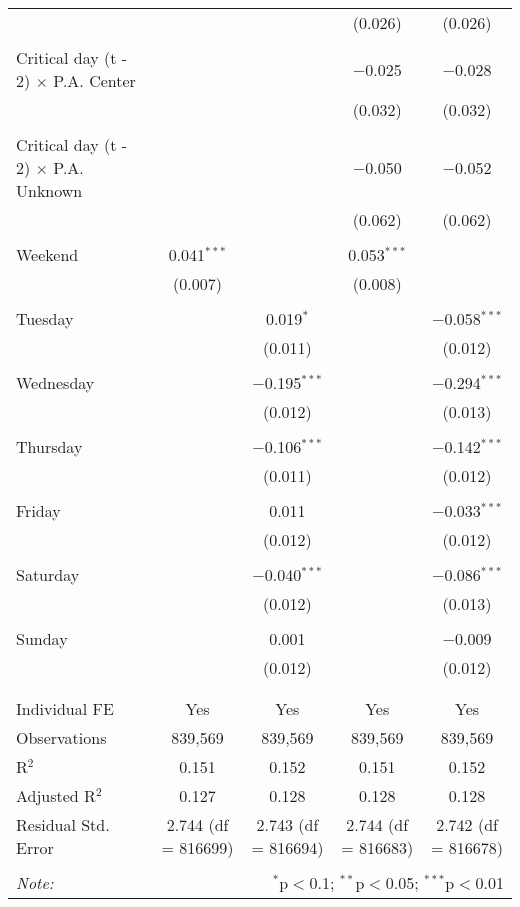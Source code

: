 \documentclass[
]{article}
\begin{document}
\begin{table}[!htbp]
{\begin{tabular}{@{\extracolsep{5pt}}lcccc}
  &  &  & (0.026) & (0.026) \\ 
  & & & & \\ 
 Critical day (t - 2) $\times$ P.A. Center &  &  & $-$0.025 & $-$0.028 \\ 
  &  &  & (0.032) & (0.032) \\ 
  & & & & \\ 
 Critical day (t - 2) $\times$ P.A. Unknown &  &  & $-$0.050 & $-$0.052 \\ 
  &  &  & (0.062) & (0.062) \\ 
  & & & & \\ 
 Weekend & 0.041$^{***}$ &  & 0.053$^{***}$ &  \\ 
  & (0.007) &  & (0.008) &  \\ 
  & & & & \\ 
 Tuesday &  & 0.019$^{*}$ &  & $-$0.058$^{***}$ \\ 
  &  & (0.011) &  & (0.012) \\ 
  & & & & \\ 
 Wednesday &  & $-$0.195$^{***}$ &  & $-$0.294$^{***}$ \\ 
  &  & (0.012) &  & (0.013) \\ 
  & & & & \\ 
 Thursday &  & $-$0.106$^{***}$ &  & $-$0.142$^{***}$ \\ 
  &  & (0.011) &  & (0.012) \\ 
  & & & & \\ 
 Friday &  & 0.011 &  & $-$0.033$^{***}$ \\ 
  &  & (0.012) &  & (0.012) \\ 
  & & & & \\ 
 Saturday &  & $-$0.040$^{***}$ &  & $-$0.086$^{***}$ \\ 
  &  & (0.012) &  & (0.013) \\ 
  & & & & \\ 
 Sunday &  & 0.001 &  & $-$0.009 \\ 
  &  & (0.012) &  & (0.012) \\ 
  & & & & \\ 
\hline \\[-1.8ex] 
Individual FE & Yes & Yes & Yes & Yes \\ 
Observations & 839,569 & 839,569 & 839,569 & 839,569 \\ 
R$^{2}$ & 0.151 & 0.152 & 0.151 & 0.152 \\ 
Adjusted R$^{2}$ & 0.127 & 0.128 & 0.128 & 0.128 \\ 
Residual Std. Error & 2.744 (df = 816699) & 2.743 (df = 816694) & 2.744 (df = 816683) & 2.742 (df = 816678) \\ 
\hline 
\hline \\[-1.8ex] 
\textit{Note:}  & \multicolumn{4}{r}{$^{*}$p$<$0.1; $^{**}$p$<$0.05; $^{***}$p$<$0.01} \\ 
\end{tabular}
} 
\end{table}
\end{document}
